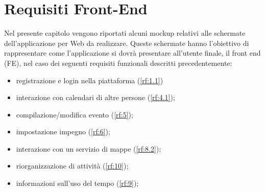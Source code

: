 \section{Requisiti Front-End}
\label{sec:RequisitiFrontEnd}

Nel presente capitolo vengono riportati alcuni mockup relativi alle schermate dell’applicazione per Web da realizzare. Queste schermate hanno l’obiettivo di rappresentare come l’applicazione si dovrà presentare all’utente finale, il front end (FE), nel caso dei seguenti requisiti funzionali descritti precedentemente: 
\begin{itemize}
    \item registrazione e login nella piattaforma (\ref{rf:1.1})
    \item interazione con calendari di altre persone (\ref{rf:4.1});
    \item compilazione/modifica evento (\ref{rf:5});
    \item impostazione impegno (\ref{rf:6});
    \item interazione con un servizio di mappe (\ref{rf:8.2});
    \item riorganizzazione di attività (\ref{rf:10});
    \item informazioni sull’uso del tempo (\ref{rf:9});
\end{itemize}

